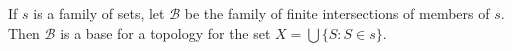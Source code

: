 If $s$ is a family of sets, let $\mathcal{B}$ be the family of finite intersections of members of $s$. Then $\mathcal{B}$ is a base for a topology for the set $X = \bigcup \{S : S \in s\}$.
